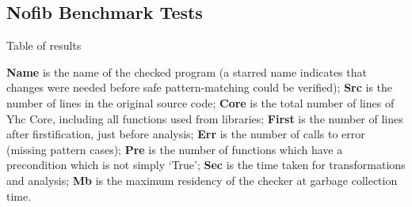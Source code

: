 \documentclass[preprint]{sigplanconf}
\newcommand{\C}[1]{\textsf{#1}}
\begin{document}
\subsection{Nofib Benchmark Tests}
\label{sec:imaginary}

\begin{table}
\caption{Table of results}
\label{tab:results}

\smallskip

\textbf{Name} is the name of the checked program (a starred name indicates that changes were needed before safe pattern-matching could be verified);
\textbf{Src} is the number of lines in the original source code;
\textbf{Core} is the total number of lines of Yhc Core, including all functions used from libraries;
\textbf{First} is the number of lines after firstification, just before analysis;
\textbf{Err} is the number of calls to \C{error} (missing pattern cases);
\textbf{Pre} is the number of functions which have a precondition which is not simply `True';
\textbf{Sec} is the time taken for transformations and analysis;
\textbf{Mb} is the maximum residency of the checker at garbage collection time.

\smallskip\smallskip


\end{table}
\end{document}
